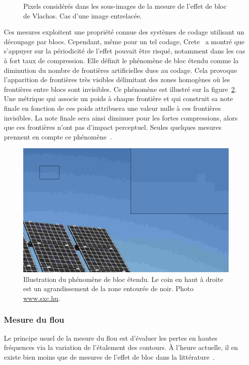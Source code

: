 \begin{figure}[htbp]
  \centering
  \begin{tikzpicture}[scale=0.4]\end{tikzpicture}
  \caption{Pixels considérés dans les sous-images de la mesure de l'effet de bloc de Vlachos. Cas d'une image entrelacée.}
  \label{fig:vlachos}
\end{figure}

Ces mesures exploitent une propriété connue des systèmes de codage utilisant un découpage par blocs. Cependant, même pour un tel codage, Crete~\cite{crete-phd} a montré que s'appuyer sur la périodicité de l'effet pouvait être risqué, notamment dans les cas à fort taux de compression. Elle définit le phénomène de bloc étendu comme la diminution du nombre de frontières artificielles dues au codage. Cela provoque l'apparition de frontières très visibles délimitant des zones homogènes où les frontières entre blocs sont invisibles. Ce phénomène est illustré sur la figure~\ref{fig:blocEtendu}. Une métrique qui associe un poids à chaque frontière et qui construit sa note finale en fonction de ces poids attribuera une valeur nulle à ces frontières invisibles. La note finale sera ainsi diminuer pour les fortes compressions, alors que ces frontières n'ont pas d'impact perceptuel. Seules quelques mesures prennent en compte ce phénomène~\cite{gao-tcsvt2002,pan-iscs2004}.

\begin{figure}[htbp]
  \centering
  \includegraphics[width=0.8\linewidth]{img/chap4/blocEtendu}
  \caption{Illustration du phénomène de bloc étendu. Le coin en haut à droite est un agrandissement de la zone entourée de noir. Photo \href{http://www.sxc.hu/photo/946616}{www.sxc.hu}.}
  \label{fig:blocEtendu}
\end{figure}


\subsubsection{Mesure du flou} \label{ssec:flou}
Le principe usuel de la mesure du flou est d'évaluer les pertes en hautes fréquences via la variation de l'étalement des contours. À l'heure actuelle, il en existe bien moins que de mesures de l'effet de bloc dans la littérature~\cite{elder-pami1998,wu-icsp2005,hu-icip2006}.

